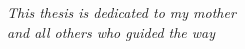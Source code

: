 \chapter*{~}


\begin{center}                  %
\vspace*{3in}                   %
    \begin{onehalfspacing}      %
    \textit{
    This thesis is dedicated to my mother\\
    and all others who guided the way     %
    }
\end{onehalfspacing}
\end{center}